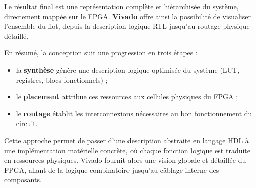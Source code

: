 \medskip

Le résultat final est une représentation complète et hiérarchisée du système, directement mappée sur le FPGA. 
\textbf{Vivado} offre ainsi la possibilité de visualiser l'ensemble du flot, depuis la description logique RTL jusqu'au routage physique détaillé.  

En résumé, la conception suit une progression en trois étapes :  
\begin{itemize}
    \item la \textbf{synthèse} génère une description logique optimisée du système (LUT, registres, blocs fonctionnels) ;  
    \item le \textbf{placement} attribue ces ressources aux cellules physiques du FPGA ;  
    \item le \textbf{routage} établit les interconnexions nécessaires au bon fonctionnement du circuit.  
\end{itemize}

Cette approche permet de passer d'une description abstraite en langage HDL à une implémentation matérielle 
concrète, où chaque fonction logique est traduite en ressources physiques. 
Vivado fournit alors une vision globale et détaillée du FPGA, allant de la logique combinatoire jusqu'au câblage interne des composants.
